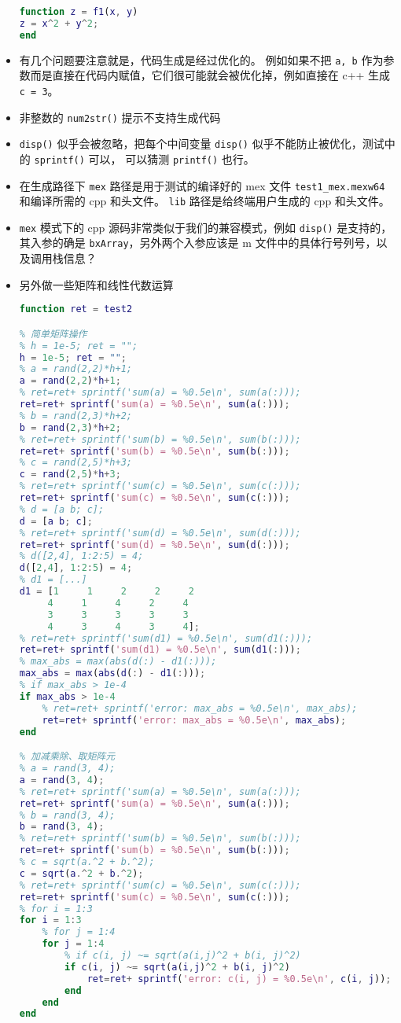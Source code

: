 \begin{itemize}
\begin{lstlisting}[language=matlab,caption=test1.m]
% 子函数
function z = f1(x, y)
z = x^2 + y^2;
end
\end{lstlisting}
\item 有几个问题要注意就是，代码生成是经过优化的。 例如如果不把 \verb`a, b` 作为参数而是直接在代码内赋值，它们很可能就会被优化掉，例如直接在 c++ 生成 \verb`c = 3`。
\item 非整数的 \verb`num2str()` 提示不支持生成代码
\item \verb`disp()` 似乎会被忽略，把每个中间变量 \verb`disp()` 似乎不能防止被优化，测试中的 \verb`sprintf()` 可以， 可以猜测 \verb`printf()` 也行。
\item 在生成路径下 \verb`mex` 路径是用于测试的编译好的 mex 文件 \verb`test1_mex.mexw64` 和编译所需的 cpp 和头文件。 \verb`lib` 路径是给终端用户生成的 cpp 和头文件。
\item \verb`mex` 模式下的 cpp 源码非常类似于我们的兼容模式，例如 \verb`disp()` 是支持的，其入参的确是 \verb`bxArray`，另外两个入参应该是 m 文件中的具体行号列号，以及调用栈信息？
\item 另外做一些矩阵和线性代数运算
\begin{lstlisting}[language=matlab]
function ret = test2

% 简单矩阵操作
% h = 1e-5; ret = "";
h = 1e-5; ret = "";
% a = rand(2,2)*h+1;
a = rand(2,2)*h+1;
% ret=ret+ sprintf('sum(a) = %0.5e\n', sum(a(:)));
ret=ret+ sprintf('sum(a) = %0.5e\n', sum(a(:)));
% b = rand(2,3)*h+2;
b = rand(2,3)*h+2;
% ret=ret+ sprintf('sum(b) = %0.5e\n', sum(b(:)));
ret=ret+ sprintf('sum(b) = %0.5e\n', sum(b(:)));
% c = rand(2,5)*h+3;
c = rand(2,5)*h+3;
% ret=ret+ sprintf('sum(c) = %0.5e\n', sum(c(:)));
ret=ret+ sprintf('sum(c) = %0.5e\n', sum(c(:)));
% d = [a b; c];
d = [a b; c];
% ret=ret+ sprintf('sum(d) = %0.5e\n', sum(d(:)));
ret=ret+ sprintf('sum(d) = %0.5e\n', sum(d(:)));
% d([2,4], 1:2:5) = 4;
d([2,4], 1:2:5) = 4;
% d1 = [...]
d1 = [1     1     2     2     2
     4     1     4     2     4
     3     3     3     3     3
     4     3     4     3     4];
% ret=ret+ sprintf('sum(d1) = %0.5e\n', sum(d1(:)));
ret=ret+ sprintf('sum(d1) = %0.5e\n', sum(d1(:)));
% max_abs = max(abs(d(:) - d1(:)));
max_abs = max(abs(d(:) - d1(:)));
% if max_abs > 1e-4
if max_abs > 1e-4
    % ret=ret+ sprintf('error: max_abs = %0.5e\n', max_abs);
    ret=ret+ sprintf('error: max_abs = %0.5e\n', max_abs);
end

% 加减乘除、取矩阵元
% a = rand(3, 4);
a = rand(3, 4);
% ret=ret+ sprintf('sum(a) = %0.5e\n', sum(a(:)));
ret=ret+ sprintf('sum(a) = %0.5e\n', sum(a(:)));
% b = rand(3, 4);
b = rand(3, 4);
% ret=ret+ sprintf('sum(b) = %0.5e\n', sum(b(:)));
ret=ret+ sprintf('sum(b) = %0.5e\n', sum(b(:)));
% c = sqrt(a.^2 + b.^2);
c = sqrt(a.^2 + b.^2);
% ret=ret+ sprintf('sum(c) = %0.5e\n', sum(c(:)));
ret=ret+ sprintf('sum(c) = %0.5e\n', sum(c(:)));
% for i = 1:3
for i = 1:3
    % for j = 1:4
    for j = 1:4
        % if c(i, j) ~= sqrt(a(i,j)^2 + b(i, j)^2)
        if c(i, j) ~= sqrt(a(i,j)^2 + b(i, j)^2)
            ret=ret+ sprintf('error: c(i, j) = %0.5e\n', c(i, j));
        end
    end
end


\end{lstlisting}
\end{itemize}
